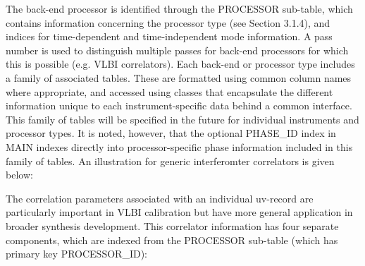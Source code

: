 \documentclass{article}
\begin{document}
The back-end processor is identified through the PROCESSOR sub-table,
which contains information concerning the processor type (see Section
3.1.4), and indices for time-dependent and time-independent mode
information. A pass number is used to distinguish multiple passes for
back-end processors for which this is possible (e.g. VLBI
correlators). Each back-end or processor type includes a family of
associated tables. These are formatted using common column names where
appropriate, and accessed using classes that encapsulate the different
information unique to each instrument-specific data behind a common
interface. This family of tables will be specified in the future for
individual instruments and processor types. It is noted, however, that
the optional PHASE\_ID index in MAIN indexes directly into
processor-specific phase information included in this family of
tables. An illustration for generic interferomter correlators is given
below:

The correlation parameters associated with an individual uv-record are
particularly important in VLBI calibration but have more general
application in broader synthesis development. This correlator
information has four separate components, which are indexed from the
PROCESSOR sub-table (which has primary key PROCESSOR\_ID):
\end{document}
